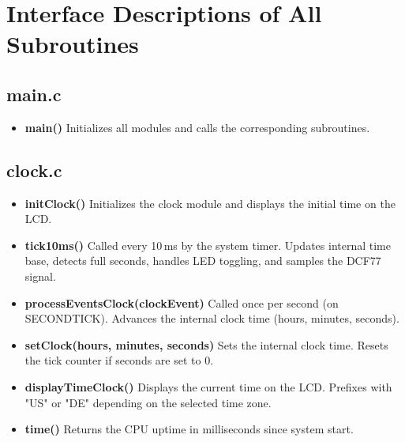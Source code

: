 \documentclass[a4paper,12pt]{article}
\begin{document}
\newpage


\section{Interface Descriptions of All Subroutines}


\subsection{main.c}
\begin{itemize}
    \item \textbf{main()}  
    Initializes all modules and calls the corresponding subroutines.
\end{itemize}


\subsection{clock.c}
\begin{itemize}
    \item \textbf{initClock()}  
    Initializes the clock module and displays the initial time on the LCD.

    \item \textbf{tick10ms()}  
    Called every 10\,ms by the system timer. Updates internal time base, detects full seconds, handles LED toggling, and samples the DCF77 signal.

    \item \textbf{processEventsClock(clockEvent)}  
    Called once per second (on SECONDTICK). Advances the internal clock time (hours, minutes, seconds).

    \item \textbf{setClock(hours, minutes, seconds)}  
    Sets the internal clock time. Resets the tick counter if seconds are set to 0.

    \item \textbf{displayTimeClock()}  
    Displays the current time on the LCD. Prefixes with "US" or "DE" depending on the selected time zone.

    \item \textbf{time()}  
    Returns the CPU uptime in milliseconds since system start.
\end{itemize}
\end{document}
